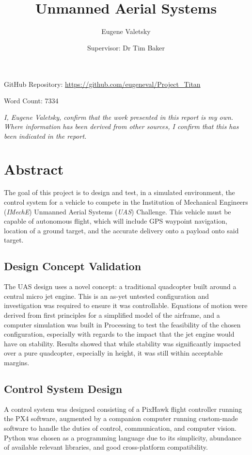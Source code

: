 \documentclass[11pt,twoside]{article}
\author{Eugene Valetsky\\ \and Supervisor: Dr Tim Baker}
\title{Unmanned Aerial Systems}
\begin{document}
\maketitle

\begin{center}
    GitHub Repository: \url{https://github.com/eugeneval/Project_Titan}

    \vspace{2em}
    Word Count: 7334



    \vspace{6em}
    \emph{I, Eugene Valetsky, confirm that the work presented in this report is my own. Where information has been derived from other sources, I confirm that this has been indicated in the report.}
\end{center}

\newpage
\tableofcontents
\listoffigures
\newpage



\section{Abstract}
The goal of this project is to design and test, in a simulated environment, the control system for a vehicle to compete in the Institution of Mechanical Engineers (\emph{IMechE}) Unmanned Aerial Systems (\emph{UAS}) Challenge. This vehicle must be capable of autonomous flight, which will include GPS waypoint navigation, location of a ground target, and the accurate delivery onto a payload onto said target\cite{IMechE_rules}.

\subsection*{Design Concept Validation}
The UAS design uses a novel concept: a traditional quadcopter built around a central micro jet engine\cite{Ismail_paper}. This is an as-yet untested configuration and investigation was required to ensure it was controllable. Equations of motion were derived from first principles for a simplified model of the airframe, and a computer simulation was built in Processing\cite{processing} to test the feasibility of the chosen configuration, especially with regards to the impact that the jet engine would have on stability. Results showed that while stability was significantly impacted over a pure quadcopter, especially in height, it was still within acceptable margins.

\subsection*{Control System Design}
A control system was designed consisting of a PixHawk flight controller running the PX4 software\cite{PX4_user_guide}, augmented by a companion computer running custom-made software to handle the duties of control, communication, and computer vision. Python\cite{python} was chosen as a programming language due to its simplicity, abundance of available relevant libraries, and good cross-platform compatibility.
\end{document}
